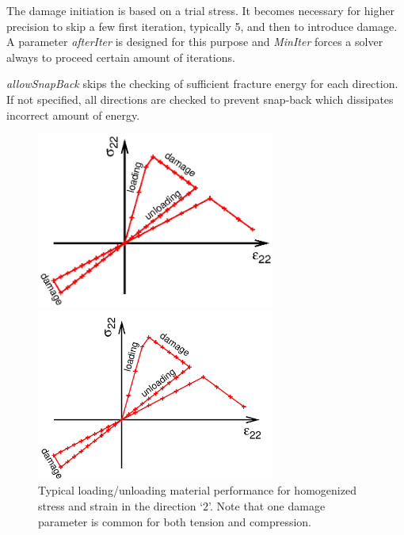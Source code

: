 \documentclass[a4paper]{article}
\newcommand{\param}[1]{{\it #1}}
\begin{document}
The damage initiation is based on a trial stress. It becomes necessary for  higher precision to skip a few first iteration, typically 5, and then to introduce damage. A parameter \param{afterIter} is designed for this purpose and \param{MinIter} forces a solver always to proceed certain amount of iterations.

\param{allowSnapBack} skips the checking of sufficient fracture energy for each direction. If not specified, all directions are checked to prevent snap-back which dissipates incorrect amount of energy.


\begin{figure}[!htb]
\begin{htmlonly}
  \centerline{\includegraphics[width=0.7\textwidth]{Compodamagemat_test.eps}}
\end{htmlonly}
\centerline{\includegraphics[width=0.7\textwidth]{Compodamagemat_test}}
  \caption{Typical loading/unloading material performance for homogenized stress and strain in the direction `${2}$'. Note that one damage parameter is common for both tension and compression.}
  \label{comp_performance}
\end{figure}
\end{document}
